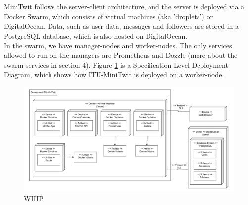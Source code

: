 MiniTwit follows the server-client architecture, and the server is deployed via a Docker Swarm, which consists of virtual machines (aka 'droplets') on DigitalOcean. Data, such as user-data, messages and followers are stored in a PostgreSQL database, which is also hosted on DigitalOcean. \\
In the swarm, we have manager-nodes and worker-nodes. The only services allowed to run on the managers are Prometheus and Dozzle (more about the swarm services in section 4). Figure \ref{fig:DeployDiagram} is a Specification Level Deployment Diagram, which shows how ITU-MiniTwit is deployed on a worker-node.
\begin{figure}[h]
\centering
\includegraphics[width=\textwidth]{images/DeployDiagramWIP.pdf}
\caption{WIIIP}
\label{fig:DeployDiagram}
\end{figure}